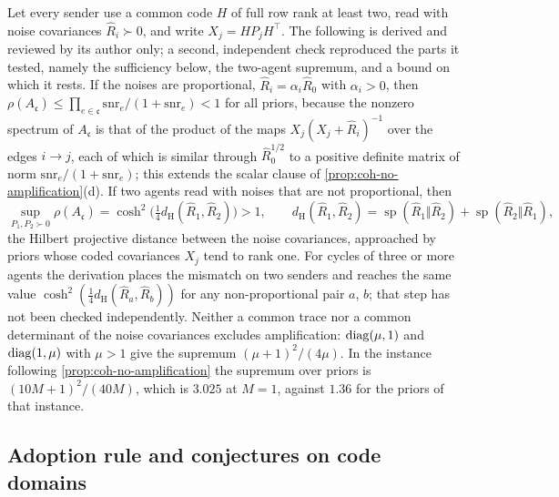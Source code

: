 \begin{remark}\label{rem:coh-proportional-noise}
Let every sender use a common code $H$ of full row rank at least two, read with noise covariances $\hat R_i\succ0$, and write $X_j=HP_jH^\top$. The following is derived and reviewed by its author only; a second, independent check reproduced the parts it tested, namely the sufficiency below, the two-agent supremum, and a bound on which it rests. If the noises are proportional, $\hat R_i=\alpha_i\hat R_0$ with $\alpha_i>0$, then $\rho(A_{\mathfrak c})\le\prod_{e\in\mathfrak c}\mathrm{snr}_e/(1+\mathrm{snr}_e)<1$ for all priors, because the nonzero spectrum of $A_{\mathfrak c}$ is that of the product of the maps $X_j(X_j+\hat R_i)^{-1}$ over the edges $i\to j$, each of which is similar through $\hat R_0^{1/2}$ to a positive definite matrix of norm $\mathrm{snr}_e/(1+\mathrm{snr}_e)$; this extends the scalar clause of \cref{prop:coh-no-amplification}(d). If two agents read with noises that are not proportional, then
\[ \sup_{P_1,P_2\succ0}\rho(A_{\mathfrak c})=\cosh^2\bigl(\tfrac14d_{\mathrm H}(\hat R_1,\hat R_2)\bigr)>1,\qquad d_{\mathrm H}(\hat R_1,\hat R_2)=\operatorname{sp}(\hat R_1\Vert\hat R_2)+\operatorname{sp}(\hat R_2\Vert\hat R_1), \]
the Hilbert projective distance between the noise covariances, approached by priors whose coded covariances $X_j$ tend to rank one. For cycles of three or more agents the derivation places the mismatch on two senders and reaches the same value $\cosh^2(\frac14d_{\mathrm H}(\hat R_a,\hat R_b))$ for any non-proportional pair $a$, $b$; that step has not been checked independently. Neither a common trace nor a common determinant of the noise covariances excludes amplification: $\operatorname{diag}(\mu,1)$ and $\operatorname{diag}(1,\mu)$ with $\mu>1$ give the supremum $(\mu+1)^2/(4\mu)$. In the instance following \cref{prop:coh-no-amplification} the supremum over priors is $(10M+1)^2/(40M)$, which is $3.025$ at $M=1$, against $1.36$ for the priors of that instance.
\end{remark}

\subsection{Adoption rule and conjectures on code domains}\label{sup:coh-adoption-rule-and-conjectures-on-code-do}

